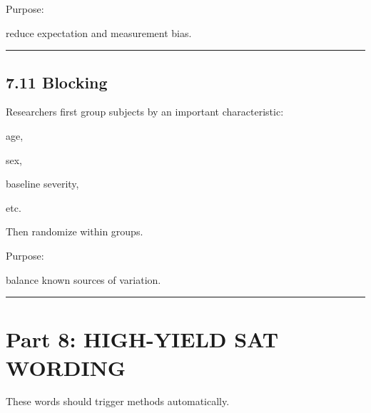 \documentclass[
]{article}
\begin{document}
Purpose:

reduce expectation and measurement bias.

\begin{center}\rule{0.5\linewidth}{0.5pt}\end{center}

\subsection{7.11 Blocking}\label{blocking}

Researchers first group subjects by an important characteristic:

age,

sex,

baseline severity,

etc.

Then randomize within groups.

Purpose:

balance known sources of variation.

\begin{center}\rule{0.5\linewidth}{0.5pt}\end{center}

\section{Part 8: HIGH-YIELD SAT
WORDING}\label{part-8-high-yield-sat-wording}

These words should trigger methods automatically.
\end{document}
